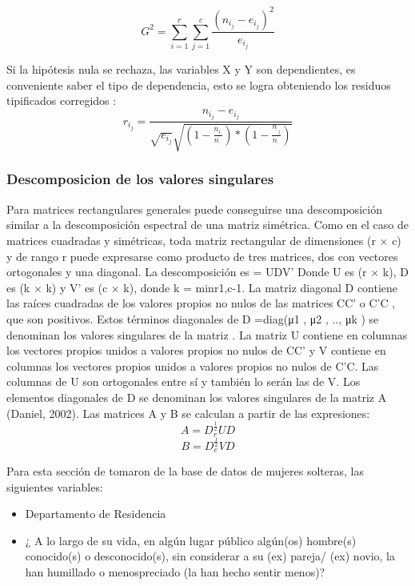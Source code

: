 \documentclass[11pt,letter]{article}
\begin{document}
\begin{equation}
G^2 = \sum_{i=1}^{r}\sum_{j=1}^{c}\frac{(n_i_j-e_i_j)^2}{e_i_j} 
\label{eq1}
\end{equation}

Si la hipótesis nula se rechaza,
las variables X y Y son dependientes,
es conveniente saber el tipo de dependencia, esto se logra obteniendo
los residuos tipificados corregidos :
\begin{equation}
r_i_j = \frac{n_i_j-e_i_j}{\sqrt{e_i_j}\sqrt{(1-\frac{n_i_.}{n_._.})*(1-\frac{n_._j}{n_._.})}}

\end{equation}

\subsubsection{Descomposicion de los valores singulares}

Para matrices rectangulares generales puede conseguirse una descomposición similar a la descomposición espectral de una matriz
simétrica. Como en el caso de matrices cuadradas y simétricas, toda matriz rectangular de dimensiones (r ×
c) y de rango r puede expresarse como
producto de tres matrices, dos con
vectores ortogonales y una diagonal.
La descomposición es
 = UDV’
Donde U es (r × k), D es (k ×
k) y V’ es (c × k), donde k = min{r1,c-1}. La matriz diagonal D contiene las raíces cuadradas de los valores propios no nulos de las matrices
CC’ o C’C , que son positivos. Estos
términos diagonales de D =diag(μ1
,
μ2
, .., μk
) se denominan los valores
singulares de la matriz . La matriz U
contiene en columnas los vectores
propios unidos a valores propios no
nulos de CC’ y V contiene en columnas los vectores propios unidos
a valores propios no nulos de C’C.
Las columnas de U son ortogonales
entre sí y también lo serán las de V.
Los elementos diagonales de D se
denominan los valores singulares de
la matriz A (Daniel, 2002).
Las matrices A y B se calculan a
partir de las expresiones:
$$A=D_r^{\frac{1}{2}}UD$$
$$B=D_c^{\frac{1}{2}}VD$$

Para esta sección de tomaron de la base de datos de mujeres solteras, las siguientes variables:
\begin{itemize}
\item Departamento de Residencia
\item ¿ A lo largo de su vida, en algún lugar público algún(os) hombre(s) conocido(s) o desconocido(s), sin considerar a su (ex) pareja/ (ex) novio, la han humillado o menospreciado (la han hecho sentir menos)?
\end{itemize}
\end{document}
